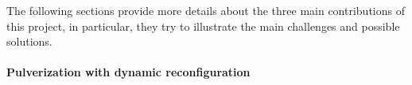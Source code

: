 \documentclass[12pt,a4paper]{article}
\begin{document}
{%

The following sections provide more details about the three main contributions of this project,
in particular,
they try to illustrate the main challenges and possible solutions.
}
\paragraph{Pulverization with dynamic reconfiguration}\label{sec:pulv-dyn}
\end{document}

